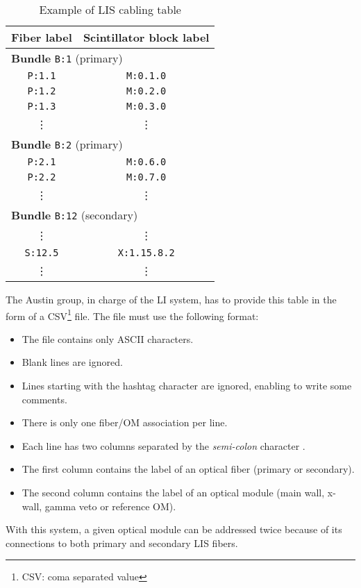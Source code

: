 \documentclass[12pt,a4paper]{article}
\begin{document}
\begin{table}[h]
\begin{center}
\begin{tabular}{|c|c|}
  \hline
  \textbf{Fiber label} & \textbf{Scintillator block label} \\
  \hline
  \hline
  \multicolumn{2}{|l|}{\textbf{Bundle} \texttt{B:1} (primary)}  \\
  \hline
  \texttt{P:1.1}  & \texttt{M:0.1.0} \\
  \hline
  \texttt{P:1.2}  & \texttt{M:0.2.0} \\
  \hline
  \texttt{P:1.3}  & \texttt{M:0.3.0} \\
  \hline
  \vdots          & \vdots             \\  
  \hline
  \hline
  \multicolumn{2}{|l|}{\textbf{Bundle} \texttt{B:2} (primary)}  \\
  \hline
  \texttt{P:2.1}  & \texttt{M:0.6.0} \\
  \hline
  \texttt{P:2.2}  & \texttt{M:0.7.0} \\
  \hline
  \vdots          & \vdots             \\  
  \hline
  \hline
  \multicolumn{2}{|l|}{\textbf{Bundle} \texttt{B:12} (secondary)}  \\
  \hline
  \vdots          & \vdots             \\  
  \hline
  \texttt{S:12.5}  & \texttt{X:1.15.8.2} \\
  \hline
  \vdots          & \vdots             \\  
  \hline
\end{tabular}
\end{center}
\caption{Example of LIS cabling table}
\label{tab:lis:map:1}
\end{table}

\par\noindent The  Austin group, in  charge of  the LI system,  has to
provide this table  in the form of a  CSV\footnote{CSV: coma separated
  value} file. The file must use the following format:

\begin{itemize}
\item The file contains only ASCII characters.
\item Blank lines are ignored.
\item Lines starting with the hashtag character \fbox{\texttt{\#}} are
  ignored, enabling to write some comments.
\item There is only one fiber/OM association per line.
\item Each  line has  two columns  separated by  the \emph{semi-colon}
  character \fbox{\texttt{;}}.
\item The first column contains the label of an optical fiber (primary
  or secondary).
\item The second column contains the  label of an optical module (main
  wall, x-wall, gamma veto or reference OM).
\end{itemize}
\par\noindent  With  this  system,  a  given  optical  module  can  be
addressed  twice  because  of  its connections  to  both  primary  and
secondary LIS fibers.
\end{document}
